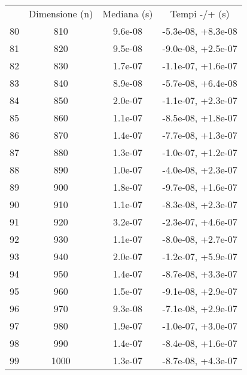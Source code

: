\begin{table}
\centering
\begin{adjustbox}{width=1\textwidth/2}
\begin{tabular}{|c|c|c|c|}
\hline
 & Dimensione (n) & Mediana (s) & Tempi -/+ (s) \\
80 & 810 & 9.6e-08 & -5.3e-08, +8.3e-08 \\
\cline{1-4}
81 & 820 & 9.5e-08 & -9.0e-08, +2.5e-07 \\
\cline{1-4}
82 & 830 & 1.7e-07 & -1.1e-07, +1.6e-07 \\
\cline{1-4}
83 & 840 & 8.9e-08 & -5.7e-08, +6.4e-08 \\
\cline{1-4}
84 & 850 & 2.0e-07 & -1.1e-07, +2.3e-07 \\
\cline{1-4}
85 & 860 & 1.1e-07 & -8.5e-08, +1.8e-07 \\
\cline{1-4}
86 & 870 & 1.4e-07 & -7.7e-08, +1.3e-07 \\
\cline{1-4}
87 & 880 & 1.3e-07 & -1.0e-07, +1.2e-07 \\
\cline{1-4}
88 & 890 & 1.0e-07 & -4.0e-08, +2.3e-07 \\
\cline{1-4}
89 & 900 & 1.8e-07 & -9.7e-08, +1.6e-07 \\
\cline{1-4}
90 & 910 & 1.1e-07 & -8.3e-08, +2.3e-07 \\
\cline{1-4}
91 & 920 & 3.2e-07 & -2.3e-07, +4.6e-07 \\
\cline{1-4}
92 & 930 & 1.1e-07 & -8.0e-08, +2.7e-07 \\
\cline{1-4}
93 & 940 & 2.0e-07 & -1.2e-07, +5.9e-07 \\
\cline{1-4}
94 & 950 & 1.4e-07 & -8.7e-08, +3.3e-07 \\
\cline{1-4}
95 & 960 & 1.5e-07 & -9.1e-08, +2.9e-07 \\
\cline{1-4}
96 & 970 & 9.3e-08 & -7.1e-08, +2.9e-07 \\
\cline{1-4}
97 & 980 & 1.9e-07 & -1.0e-07, +3.0e-07 \\
\cline{1-4}
98 & 990 & 1.4e-07 & -8.4e-08, +1.6e-07 \\
\cline{1-4}
99 & 1000 & 1.3e-07 & -8.7e-08, +4.3e-07 \\
\cline{1-4}
\end{tabular}
\end{adjustbox}
\end{table}

